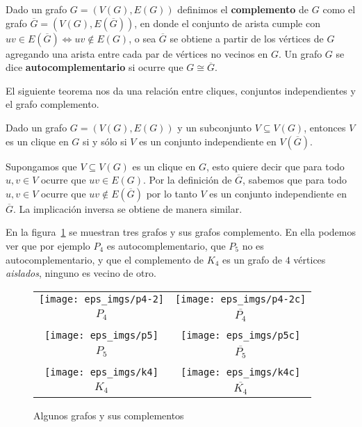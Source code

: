 \begin{definicion}
Dado un grafo $G=(V(G),E(G))$ definimos el {\bf complemento} de $G$ como el grafo $\overline{G}=(V(G),E(\overline{G}))$, en donde el conjunto de arista cumple con $uv\in E(\overline G)\Leftrightarrow uv\notin E(G)$,
o sea $\overline G$ se obtiene a partir de los vértices de $G$ agregando una arista entre cada par de vértices no vecinos en $G$.
Un grafo $G$ se dice {\bf autocomplementario} si ocurre que $G\cong\overline G$.
\end{definicion}

El siguiente teorema nos da una relación entre cliques, conjuntos independientes y el grafo complemento.

\begin{teorema}
\label{teo:clique-indep}
Dado un grafo $G=(V(G),E(G))$ y un subconjunto $V\subseteq V(G)$, entonces $V$ es un clique en $G$ si y sólo si $V$ es un conjunto independiente en $V(\overline G)$.

\begin{demostracion}
Supongamos que $V\subseteq V(G)$ es un clique en $G$, esto quiere decir que para todo $u,v\in V$ ocurre que $uv\in E(G)$.
Por la definición de $\overline G$, sabemos que para todo $u,v\in V$ ocurre que $uv\notin E(\overline G)$ por lo tanto $V$ es un conjunto independiente en $\overline G$.
La implicación inversa se obtiene de manera similar.
\end{demostracion}
\end{teorema}

\begin{ejemplo}
En la figura~\ref{fig:complementos} se muestran tres grafos y sus grafos complemento.
En ella podemos ver que por ejemplo $P_4$ es autocomplementario, que $P_5$ no es autocomplementario, y que el complemento de $K_4$ es un grafo de $4$ vértices \emph{aislados}, ninguno es vecino de otro.
\begin{figure}[h!]
\centering
\begin{tabular}{cc}
\texttt{[image: eps\_imgs/p4-2]}\hspace*{3em} &  \texttt{[image: eps\_imgs/p4-2c]} \\
$P_4$\hspace*{3em} & $\overline{P_4}$ \\
& \\
\texttt{[image: eps\_imgs/p5]}\hspace*{3em} &  \texttt{[image: eps\_imgs/p5c]} \\
$P_5$\hspace*{3em} & $\overline{P_5}$ \\
& \\
\texttt{[image: eps\_imgs/k4]}\hspace*{3em} &  \texttt{[image: eps\_imgs/k4c]} \\
$K_4$\hspace*{3em} & $\overline{K_4}$
\end{tabular}
\caption{Algunos grafos y sus complementos}
\label{fig:complementos}
\end{figure}
\end{ejemplo}

